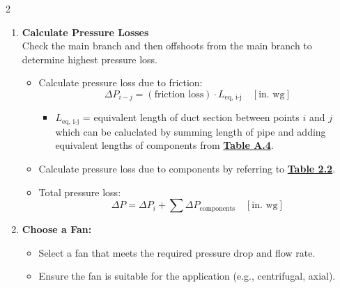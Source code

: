 \begin{multicols*}{2}
\begin{enumerate}
        \item \textbf{Calculate Pressure Losses} \\
        Check the main branch and then offshoots from the main branch to determine highest pressure loss.
              \begin{itemize}
                  \item Calculate pressure loss due to friction:
                        \[
                            \Delta P_{i-j} = (\text{friction loss})\cdot L_{\text{eq, i-j}} \quad [\text{in. wg}]
                        \]
                        \begin{itemize}
                            \item $L_{\text{eq, i-j}}$ = equivalent length of duct section between points $i$ and $j$ which can be caluclated by summing length of pipe and adding equivalent lengths of components from \underline{\textbf{Table A.4}}.
                        \end{itemize}
                  \item Calculate pressure loss due to components by referring to \underline{\textbf{Table 2.2}}.
                  \item Total pressure loss:
                        \[
                            \Delta P = \Delta P_i + \sum \Delta P_{\text{components}} \quad [\text{in. wg}]
                        \]
              \end{itemize}

        \item \textbf{Choose a Fan:}
              \begin{itemize}
                  \item Select a fan that meets the required pressure drop and flow rate.
                  \item Ensure the fan is suitable for the application (e.g., centrifugal, axial).
              \end{itemize}



\end{enumerate}
\end{multicols*}
